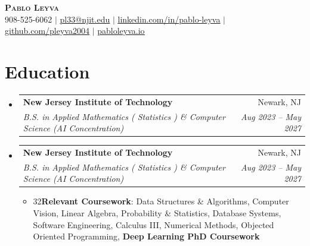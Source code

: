 \documentclass[letterpaper,10pt]{article}
\makeatletter
\newcommand{\resumeSubheading}[4]{
  \vspace{-3pt}\item
    \begin{tabular*}{0.97\textwidth}[t]{l@{\extracolsep{\fill}}r}
      \textbf{#1} & #2 \\
      \textit{\small#3} & \textit{\small #4} \\
    \end{tabular*}\vspace{-9pt}
}
\newcommand{\resumeSubHeadingListStart}{\begin{itemize}[leftmargin=0.15in, label={}]}
\newcommand{\resumeSubHeadingListEnd}{\end{itemize}}
\makeatother
\begin{document}

\begin{center}
  \textbf{\Huge \scshape Pablo Leyva} \\ \vspace{1pt}
  \small 908-525-6062 $|$ \href{mailto:x@x.com}{\underline{pl33@njit.edu}} $|$
  \href{https://linkedin.com/in/pablo-leyva}{\underline{linkedin.com/in/pablo-leyva}} $|$
  \href{https://github.com/pleyva2004}{\underline{github.com/pleyva2004}} $|$
  \href{pabloleyva.io}{\underline{pabloleyva.io}}
\end{center}
\vspace{-12pt}

\section{Education}
\vspace{5pt}
\resumeSubHeadingListStart
\resumeSubheading
{New Jersey Institute of Technology}{Newark, NJ}
{B.S. in Applied Mathematics ( Statistics ) \& Computer Science (AI Concentration) }{Aug 2023 -- May 2027}
\vspace{5pt}

\resumeSubheading
{New Jersey Institute of Technology}{Newark, NJ}
{B.S. in Applied Mathematics ( Statistics ) \& Computer Science (AI Concentration) }{Aug 2023 -- May 2027}
\vspace{5pt}


\begin{itemize}[leftmargin=0.15in, itemsep=3in, label={}]
  \small\item{
        32\textbf{Relevant Coursework}: Data Structures \& Algorithms, Computer Vision, Linear Algebra, Probability \& Statistics, Database Systems, Software Engineering, Calculus III, Numerical Methods, Objected Oriented Programming, \textbf{Deep Learning PhD Coursework}}
\end{itemize}

\resumeSubHeadingListEnd
\vspace{-15pt}
\end{document}

